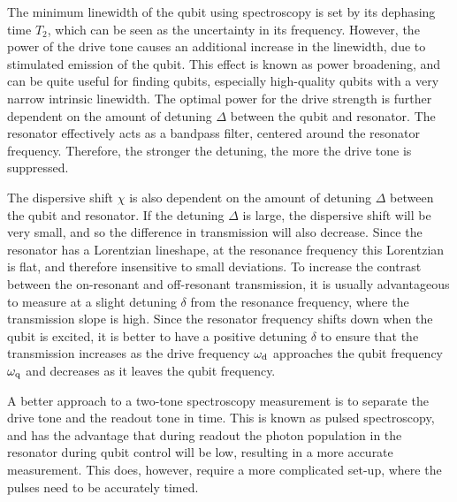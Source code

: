         The minimum linewidth of the qubit using spectroscopy is set by its dephasing time $T_2$, which can be seen as the uncertainty in its frequency. However, the power of the drive tone causes an additional increase in the linewidth, due to stimulated emission of the qubit. This effect is known as power broadening, and can be quite useful for finding qubits, especially high-quality qubits with a very narrow intrinsic linewidth. The optimal power for the drive strength is further dependent on the amount of detuning $\Delta$ between the qubit and resonator. The resonator effectively acts as a bandpass filter, centered around the resonator frequency. Therefore, the stronger the detuning, the more the drive tone is suppressed.


        The dispersive shift $\chi$ is also dependent on the amount of detuning $\Delta$ between the qubit and resonator. If the detuning $\Delta$ is large, the dispersive shift will be very small, and so the difference in transmission will also decrease. Since the resonator has a Lorentzian lineshape, at the resonance frequency this Lorentzian is flat, and therefore insensitive to small deviations. To increase the contrast between the on-resonant and off-resonant transmission, it is usually advantageous to measure at a slight detuning $\delta$ from the resonance frequency, where the transmission slope is high. Since the resonator frequency shifts down when the qubit is excited, it is better to have a positive detuning $\delta$ to ensure that the transmission increases as the drive frequency $\omega_\text{d}$ approaches the qubit frequency $\omega_\text{q}$ and decreases as it leaves the qubit frequency.

        A better approach to a two-tone spectroscopy measurement is to separate the drive tone and the readout tone in time. This is known as pulsed spectroscopy, and has the advantage that during readout the photon population in the resonator during qubit control will be low, resulting in a more accurate measurement. This does, however, require a more complicated set-up, where the pulses need to be accurately timed.



